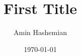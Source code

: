 \documentclass{article}%
\title{First Title}%
\author{Amin Hashemian}%
\date{\today}%
\begin{document}
%
\normalsize%
\maketitle%
\end{document}
